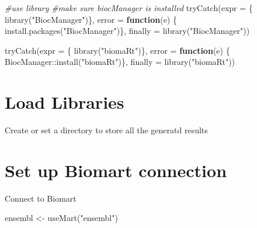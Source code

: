 \documentclass[
]{book}
\newenvironment{Shaded}{\begin{snugshade}}{\end{snugshade}}
\newcommand{\AttributeTok}[1]{\textcolor[rgb]{0.77,0.63,0.00}{#1}}
\newcommand{\CommentTok}[1]{\textcolor[rgb]{0.56,0.35,0.01}{\textit{#1}}}
\newcommand{\ControlFlowTok}[1]{\textcolor[rgb]{0.13,0.29,0.53}{\textbf{#1}}}
\newcommand{\FunctionTok}[1]{\textcolor[rgb]{0.00,0.00,0.00}{#1}}
\newcommand{\NormalTok}[1]{#1}
\newcommand{\OtherTok}[1]{\textcolor[rgb]{0.56,0.35,0.01}{#1}}
\newcommand{\SpecialCharTok}[1]{\textcolor[rgb]{0.00,0.00,0.00}{#1}}
\newcommand{\StringTok}[1]{\textcolor[rgb]{0.31,0.60,0.02}{#1}}
\begin{document}
\begin{Shaded}
\begin{Highlighting}[]
\CommentTok{\#use library}
\CommentTok{\#make sure biocManager is installed}
\FunctionTok{tryCatch}\NormalTok{(}\AttributeTok{expr =}\NormalTok{ \{ }\FunctionTok{library}\NormalTok{(}\StringTok{"BiocManager"}\NormalTok{)\}, }
         \AttributeTok{error =} \ControlFlowTok{function}\NormalTok{(e) \{ }
           \FunctionTok{install.packages}\NormalTok{(}\StringTok{"BiocManager"}\NormalTok{)\}, }
         \AttributeTok{finally =} \FunctionTok{library}\NormalTok{(}\StringTok{"BiocManager"}\NormalTok{))}


\FunctionTok{tryCatch}\NormalTok{(}\AttributeTok{expr =}\NormalTok{ \{ }\FunctionTok{library}\NormalTok{(}\StringTok{"biomaRt"}\NormalTok{)\}, }
         \AttributeTok{error =} \ControlFlowTok{function}\NormalTok{(e) \{ }
\NormalTok{           BiocManager}\SpecialCharTok{::}\FunctionTok{install}\NormalTok{(}\StringTok{"biomaRt"}\NormalTok{)\}, }
         \AttributeTok{finally =} \FunctionTok{library}\NormalTok{(}\StringTok{"biomaRt"}\NormalTok{))}
\end{Highlighting}
\end{Shaded}

\hypertarget{load-libraries}{%
\section{Load Libraries}\label{load-libraries}}

Create or set a directory to store all the generatd results

\begin{Shaded}
\end{Shaded}

\hypertarget{set-up-biomart-connection}{%
\section{Set up Biomart connection}\label{set-up-biomart-connection}}

Connect to Biomart

\begin{Shaded}
\begin{Highlighting}[]
\NormalTok{ensembl }\OtherTok{\textless{}{-}} \FunctionTok{useMart}\NormalTok{(}\StringTok{"ensembl"}\NormalTok{)}
\end{Highlighting}
\end{Shaded}
\end{document}
